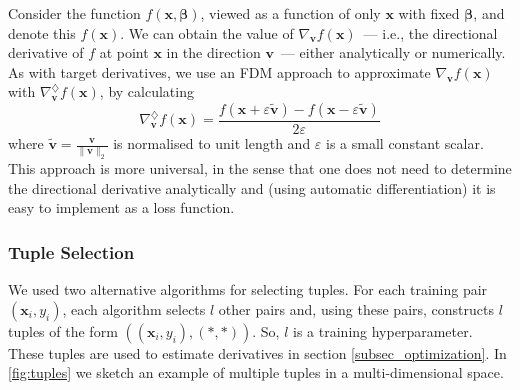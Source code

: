 \documentclass{article}
\newcommand{\kibitz}[2]{\ifnum\Comments=1\textcolor{#1}{#2}\fi}
\newcommand{\kizito}[1]{\kibitz{red} {[Kizito: #1]}}
\newcommand{\enrico}[1]{\kibitz{blue} {[Enrico: #1]}}
\newcommand{\tillman}[1]{\kibitz{darkgreen} {[Tillman: #1]}}
\begin{document}
Consider the function $f(\mathbf{x},\boldsymbol{\beta})$, viewed as a function of only $\mathbf{x}$ with fixed $\boldsymbol{\beta}$, and denote this $f(\mathbf{x})$. We can obtain the value of $\nabla_{\mathbf{v}}f(\mathbf{x})$~--- i.e., the directional derivative of $f$ at point $\mathbf{x}$ in the direction $\mathbf{v}$~--- either analytically or numerically. 
As with target derivatives, we use an FDM approach to approximate $\nabla_{\mathbf{v}}f(\mathbf{x})$ with $\nabla^{\diamondsuit}_{\mathbf{v}}f(\mathbf{x})$, by calculating%
\begin{equation} \nabla^{\diamondsuit}_{\mathbf{v}}f(\mathbf{x}) = \frac{ f(\mathbf{x}+\varepsilon\tilde{\mathbf{v}})-f(\mathbf{x}-\varepsilon\tilde{\mathbf{v}})}{2\varepsilon}
\end{equation} 
where $\tilde{\mathbf{v}} = \frac{\mathbf{v}}{\|\mathbf{v}\|_2}$ is normalised to unit length and $\varepsilon$ is a small constant scalar. %
This approach is more universal, in the sense that one does not need to determine the directional derivative analytically and (using automatic differentiation) it is easy to implement as a loss function. 

\subsubsection{Tuple Selection}

We used two alternative algorithms for selecting tuples. For each training pair $(\mathbf{x}_i, y_i)$, each algorithm selects $l$ other pairs and, using these pairs, constructs $l$ tuples of the form $((\mathbf{x}_i, y_i), (*, *))$. So, $l$ is a training hyperparameter. These tuples are used to estimate derivatives in section \ref{subsec_optimization}. %
In \autoref{fig:tuples} we sketch an example of multiple tuples in a multi-dimensional space. 
\end{document}
